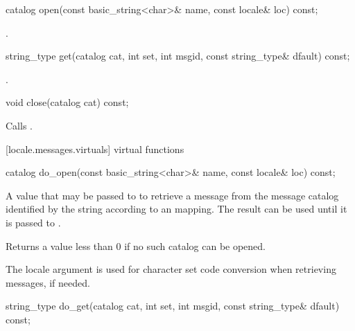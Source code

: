 %
\begin{itemdecl}
catalog open(const basic_string<char>& name, const locale& loc) const;
\end{itemdecl}

\begin{itemdescr}
\pnum
\returns
{}.
\end{itemdescr}

%
\begin{itemdecl}
string_type get(catalog cat, int set, int msgid,
                const string_type& dfault) const;
\end{itemdecl}

\begin{itemdescr}
\pnum
\returns
{}.
\end{itemdescr}

%
\begin{itemdecl}
void  close(catalog cat) const;
\end{itemdecl}

\begin{itemdescr}
\pnum
\effects
Calls
.
\end{itemdescr}

[locale.messages.virtuals]{ virtual functions}

%
\begin{itemdecl}
catalog do_open(const basic_string<char>& name,
                const locale& loc) const;
\end{itemdecl}

\begin{itemdescr}
\pnum
\returns
A value that may be passed to
to retrieve a message from the message catalog identified by the string
 according to an  mapping.
The result can be used until it is passed to
.

\pnum
Returns a value less than 0 if no such catalog can be opened.

\pnum
\remarks
The locale argument 
is used for character set code conversion when retrieving
messages, if needed.
\end{itemdescr}

%
\begin{itemdecl}
string_type do_get(catalog cat, int set, int msgid,
              const string_type& dfault) const;
\end{itemdecl}

